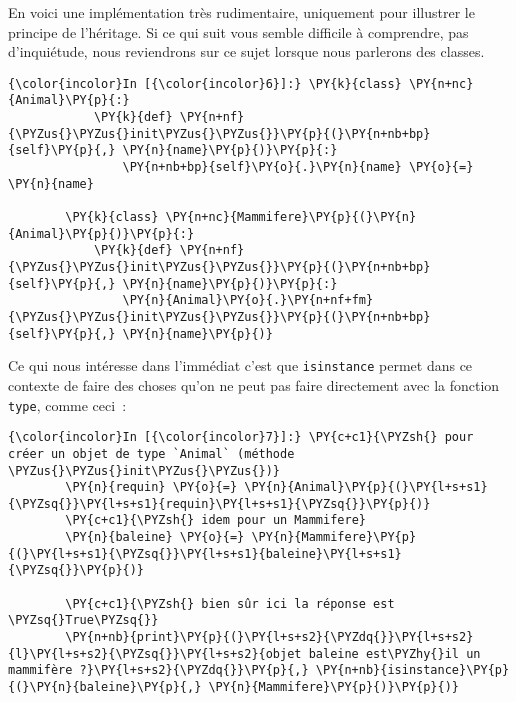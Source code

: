 En voici une implémentation très rudimentaire, uniquement pour illustrer
le principe de l'héritage. Si ce qui suit vous semble difficile à
comprendre, pas d'inquiétude, nous reviendrons sur ce sujet lorsque nous
parlerons des classes.

    \begin{Verbatim}[commandchars=\\\{\},frame=single,framerule=0.3mm,rulecolor=\color{cellframecolor}]
{\color{incolor}In [{\color{incolor}6}]:} \PY{k}{class} \PY{n+nc}{Animal}\PY{p}{:}
            \PY{k}{def} \PY{n+nf}{\PYZus{}\PYZus{}init\PYZus{}\PYZus{}}\PY{p}{(}\PY{n+nb+bp}{self}\PY{p}{,} \PY{n}{name}\PY{p}{)}\PY{p}{:}
                \PY{n+nb+bp}{self}\PY{o}{.}\PY{n}{name} \PY{o}{=} \PY{n}{name}
        
        \PY{k}{class} \PY{n+nc}{Mammifere}\PY{p}{(}\PY{n}{Animal}\PY{p}{)}\PY{p}{:}
            \PY{k}{def} \PY{n+nf}{\PYZus{}\PYZus{}init\PYZus{}\PYZus{}}\PY{p}{(}\PY{n+nb+bp}{self}\PY{p}{,} \PY{n}{name}\PY{p}{)}\PY{p}{:}
                \PY{n}{Animal}\PY{o}{.}\PY{n+nf+fm}{\PYZus{}\PYZus{}init\PYZus{}\PYZus{}}\PY{p}{(}\PY{n+nb+bp}{self}\PY{p}{,} \PY{n}{name}\PY{p}{)}
\end{Verbatim}


    Ce qui nous intéresse dans l'immédiat c'est que \texttt{isinstance}
permet dans ce contexte de faire des choses qu'on ne peut pas faire
directement avec la fonction \texttt{type}, comme ceci~:

    \begin{Verbatim}[commandchars=\\\{\},frame=single,framerule=0.3mm,rulecolor=\color{cellframecolor}]
{\color{incolor}In [{\color{incolor}7}]:} \PY{c+c1}{\PYZsh{} pour créer un objet de type `Animal` (méthode \PYZus{}\PYZus{}init\PYZus{}\PYZus{})}
        \PY{n}{requin} \PY{o}{=} \PY{n}{Animal}\PY{p}{(}\PY{l+s+s1}{\PYZsq{}}\PY{l+s+s1}{requin}\PY{l+s+s1}{\PYZsq{}}\PY{p}{)}
        \PY{c+c1}{\PYZsh{} idem pour un Mammifere}
        \PY{n}{baleine} \PY{o}{=} \PY{n}{Mammifere}\PY{p}{(}\PY{l+s+s1}{\PYZsq{}}\PY{l+s+s1}{baleine}\PY{l+s+s1}{\PYZsq{}}\PY{p}{)}
        
        \PY{c+c1}{\PYZsh{} bien sûr ici la réponse est \PYZsq{}True\PYZsq{}}
        \PY{n+nb}{print}\PY{p}{(}\PY{l+s+s2}{\PYZdq{}}\PY{l+s+s2}{l}\PY{l+s+s2}{\PYZsq{}}\PY{l+s+s2}{objet baleine est\PYZhy{}il un mammifère ?}\PY{l+s+s2}{\PYZdq{}}\PY{p}{,} \PY{n+nb}{isinstance}\PY{p}{(}\PY{n}{baleine}\PY{p}{,} \PY{n}{Mammifere}\PY{p}{)}\PY{p}{)}
\end{Verbatim}


